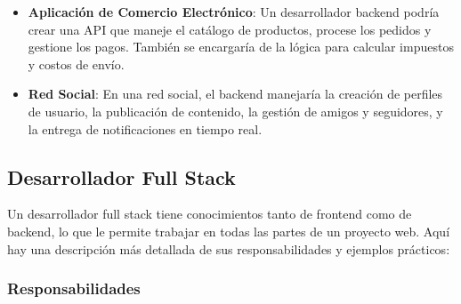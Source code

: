 \documentclass[
  letterpaper,
  DIV=11,
  numbers=noendperiod]{scrreprt}
\begin{document}
\begin{itemize}
\item
  \textbf{Aplicación de Comercio Electrónico}: Un desarrollador backend
  podría crear una API que maneje el catálogo de productos, procese los
  pedidos y gestione los pagos. También se encargaría de la lógica para
  calcular impuestos y costos de envío.
\item
  \textbf{Red Social}: En una red social, el backend manejaría la
  creación de perfiles de usuario, la publicación de contenido, la
  gestión de amigos y seguidores, y la entrega de notificaciones en
  tiempo real.
\end{itemize}

\subsection{\texorpdfstring{\textbf{Desarrollador Full
Stack}}{Desarrollador Full Stack}}\label{desarrollador-full-stack}

Un desarrollador full stack tiene conocimientos tanto de frontend como
de backend, lo que le permite trabajar en todas las partes de un
proyecto web. Aquí hay una descripción más detallada de sus
responsabilidades y ejemplos prácticos:

\subsubsection{\texorpdfstring{\textbf{Responsabilidades}}{Responsabilidades}}\label{responsabilidades-2}
\end{document}
